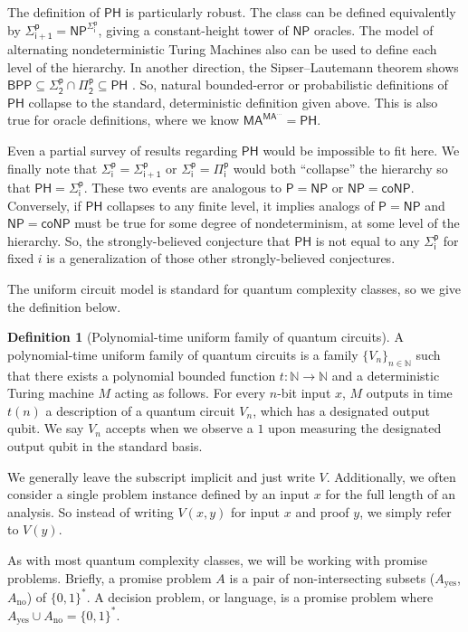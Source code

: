 \documentclass[10pt,a4paper]{article}
\theoremstyle{definition}
\newtheorem{definition}[theorem]{Definition}
\newcommand{\yes}{\text{yes}}
\newcommand{\no}{\text{no}}
\newcommand{\nats}{\mathbb N}
\newcommand{\N}{\nats}
\newcommand{\class}[1]{\ensuremath{\mathsf{#1}}\xspace}
\newcommand{\PTIME}{\class{P}}
\newcommand{\BPP}{\class{BPP}}
\newcommand{\NP}{\class{NP}}
\newcommand{\coNP}{\class{coNP}}
\newcommand{\MA}{\class{MA}}
\newcommand{\PH}{\class{PH}}
\newcommand{\Sigmai}[1][i]{\class{\Sigma^{p}_{#1}}}
\newcommand{\Pii}[1][i]{\class{\Pi^{p}_{#1}}}
\begin{document}
The definition of $\PH$ is particularly robust.
The class can be defined equivalently by $\Sigmai[i+1] = \NP^{\Sigmai[i]}$, giving a constant-height tower of $\NP$ oracles.
The model of alternating nondeterministic Turing Machines also can be used to define each level of the hierarchy.
In another direction, the Sipser–Lautemann theorem shows $\BPP \subseteq \Sigmai[2]\cap \Pii[2] \subseteq \PH$ \cite{sipser1983complexity,LAUTEMANN1983215}.
So, natural bounded-error or probabilistic definitions of $\PH$ collapse to the standard, deterministic definition given above. This is also true for oracle definitions, where we know $\MA^{\MA^{\ldots}} = \PH$.

Even a partial survey of results regarding $\PH$ would be impossible to fit here. We finally note that $\Sigmai[i]=\Sigmai[i+1]$ or $\Sigmai[i]=\Pii[i]$ would both ``collapse'' the hierarchy so that $\PH=\Sigmai[i]$. These two events are analogous to $\PTIME=\NP$ or $\NP=\coNP$. Conversely, if $\PH$ collapses to any finite level, it implies analogs of $\PTIME=\NP$ and $\NP=\coNP$ must be true for some degree of nondeterminism, at some level of the hierarchy. So, the strongly-believed conjecture that $\PH$ is not equal to any $\Sigmai[i]$ for fixed $i$ is a generalization of those other strongly-believed conjectures.

The uniform circuit model is standard for quantum complexity classes, so we give the definition below.

\begin{definition}[Polynomial-time uniform family of quantum circuits]
A polynomial-time uniform family of quantum circuits is a family $\{V_n\}_{n \in \N}$ such that there exists a polynomial bounded function $t: \N \to \N$ and a deterministic Turing machine $M$ acting as follows. 
For every $n$-bit input $x$, $M$ outputs in time $t(n)$ a description of a quantum circuit $V_n$, which has a designated output qubit. 
We say $V_n$ accepts when we observe a $1$ upon measuring the designated output qubit in the standard basis. 
\end{definition}

We generally leave the subscript implicit and just write $V$.
Additionally, we often consider a single problem instance defined by an input $x$ for the full length of an analysis.
So instead of writing $V(x,y)$ for input $x$ and proof $y$,
we simply refer to $V(y)$.

As with most quantum complexity classes, we will be working with promise problems. 
Briefly, a promise problem $A$ is a pair of non-intersecting subsets ($A_\yes$, $A_\no$) of $\{0,1\}^*$. A decision problem, or language, is a promise problem where $A_\yes\cup A_\no = \{0,1\}^*$.
\end{document}
